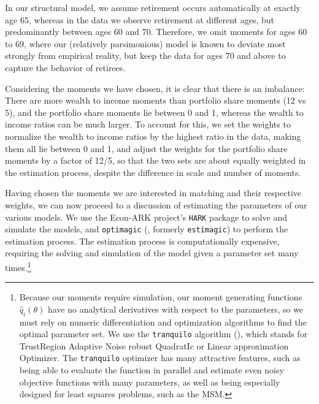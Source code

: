\documentclass[12pt,letterpaper, fleqn]{article}
\begin{document}
In our structural model, we assume retirement occurs automatically at exactly age 65, whereas in the data we observe retirement at different ages, but predominantly between ages 60 and 70.
Therefore, we omit moments for ages 60 to 69, where our (relatively parsimonious) model is known to deviate most strongly from empirical reality, but keep the data for ages 70 and above to capture the behavior of retirees.

Considering the moments we have chosen, it is clear that there is an imbalance:
There are more wealth to income moments than portfolio share moments (12 vs 5), and the portfolio share moments lie between 0 and 1, whereas the wealth to income ratios can be much larger.
To account for this, we set the weights to normalize the wealth to income ratios by the highest ratio in the data, making them all lie between 0 and 1, and adjust the weights for the portfolio share moments by a factor of 12/5, so that the two sets are about equally weighted in the estimation process, despite the difference in scale and number of moments.

Having chosen the moments we are interested in matching and their respective weights, we can now proceed to a discussion of estimating the parameters of our various models.
We use the Econ-ARK project's \texttt{HARK} package to solve and simulate the models, and \texttt{optimagic} (\cite{Gabler2022}, formerly \texttt{estimagic}) to perform the estimation process.
The estimation process is computationally expensive, requiring the solving and simulation of the model given a parameter set many times.\footnote{Because our moments require simulation, our moment generating functions $\hat{q}_i(\theta)$ have no analytical derivatives with respect to the parameters, so we must rely on numeric differentiation and optimization algorithms to find the optimal parameter set.
We use the \texttt{tranquilo} algorithm (\cite{Gabler2024}), which stands for TrustRegion Adaptive Noise robust QuadratIc or Linear approximation Optimizer.
The \texttt{tranquilo} optimizer has many attractive features, such as being able to evaluate the function in parallel and estimate even noisy objective functions with many parameters, as well as being especially designed for least squares problems, such as the MSM.}
\end{document}
